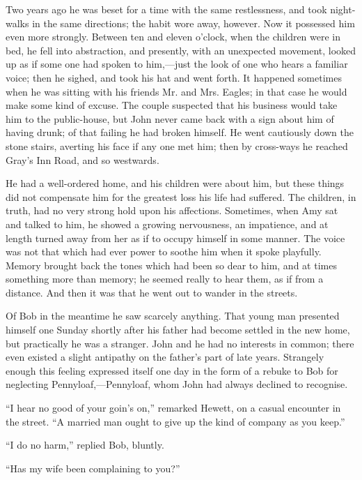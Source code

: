 {\protect\hypertarget{218}{}{}}Two years ago he was beset for a time
with the same restlessness, and took night-walks in the same directions;
the habit wore away, however. Now it possessed him even more strongly.
Between ten and eleven o'clock, when the children were in bed, he fell
into abstraction, and presently, with an unexpected movement, looked up
as if some one had spoken to him,---just the look of one who hears a
familiar voice; then he sighed, and took his hat and went forth. It
happened sometimes when he was sitting with his friends Mr. and Mrs.
Eagles; in that case he would make some kind of excuse. The couple
suspected that his business would take him to the public-house, but John
never came back with a sign about him of having drunk; of that failing
he had broken himself. He went cautiously down the stone stairs,
averting his face if any one met him; then by cross-ways he reached
Gray's Inn Road, and so westwards.

He had a well-ordered home, and his children were about him, but these
things did not compensate him for the greatest loss his life
{\protect\hypertarget{219}{}{}}had suffered. The children, in truth, had
no very strong hold upon his affections. Sometimes, when Amy sat and
talked to him, he showed a growing nervousness, an impatience, and at
length turned away from her as if to occupy himself in some manner. The
voice was not that which had ever power to soothe him when it spoke
playfully. Memory brought back the tones which had been so dear to him,
and at times something more than memory; he seemed really to hear them,
as if from a distance. And then it was that he went out to wander in the
streets.

Of Bob in the meantime he saw scarcely anything. That young man
presented himself one Sunday shortly after his father had become settled
in the new home, but practically he was a stranger. John and he had no
interests in common; there even existed a slight antipathy on the
father's part of late years. Strangely enough this feeling expressed
itself one day in the form of a rebuke to Bob for neglecting
Pennyloaf,---Pennyloaf, whom John had always declined to recognise.

{\protect\hypertarget{220}{}{}}``I hear no good of your goin's on,''
remarked Hewett, on a casual encounter in the street. ``A married man
ought to give up the kind of company as you keep.''

``I do no harm,'' replied Bob, bluntly.

``Has my wife been complaining to you?''

